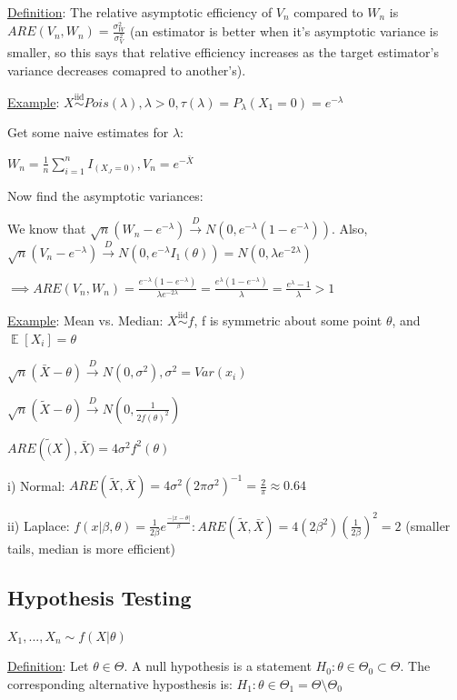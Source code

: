 \documentclass{article}
\DeclareMathOperator{\EX}{\mathbb{E}} %
\newcommand{\dto}{\overset{D}{\to}}
\let\Oldsum=\sum
\renewcommand{\sum}{\Oldsum\limits}
\newcommand{\iiddist}{\overset{\mathrm{iid}}{\sim}}
\begin{document}
\underline{Definition}: The relative asymptotic efficiency  of $V_n$ compared to $W_n$ is $ARE(V_n, W_n) = \frac{\sigma^2_W}{\sigma^2_V}$ (an estimator is better when it's asymptotic variance is smaller, so this says that relative efficiency increases as the target estimator's variance decreases comapred to another's).

\underline{Example}: $X \iiddist Pois(\lambda), \lambda > 0, \tau(\lambda) = P_{\lambda}(X_1 = 0) = e^{-\lambda}$

Get some naive estimates for $\lambda$:

$W_n = \frac{1}{n}\sum_{i=1}^n I_{(X_J = 0)}, V_n = e^{-\bar{X}}$

Now find the asymptotic variances:

We know that $\sqrt{n}(W_n - e^{-\lambda}) \dto N(0, e^{-\lambda}(1-e^{-\lambda}))$. Also, $\sqrt{n}(V_n - e^{-\lambda}) \dto N(0, e^{-\lambda}I_1(\theta)) = N(0, \lambda e^{-2\lambda})$

$\implies ARE(V_n, W_n) = \frac{e^{-\lambda}(1-e^{-\lambda})}{\lambda e^{-2\lambda}} = \frac{e^{\lambda}(1-e^{-\lambda})}{\lambda} = \frac{e^{\lambda} - 1}{\lambda} > 1$

\underline{Example}: Mean vs. Median: $X \iiddist f$, f is symmetric about some point $\theta$, and $\EX[X_i] = \theta$

$\sqrt{n}(\bar{X} - \theta) \dto N(0, \sigma^2), \sigma^2 = Var(x_i)$

$\sqrt{n}(\tilde{X} - \theta) \dto N(0, \frac{1}{2f(\theta)^2})$

$ARE(\tilde(X), \bar{X}) = 4\sigma^2f^2(\theta)$

i) Normal: $ARE(\tilde{X}, \bar{X}) = 4\sigma^2(2\pi \sigma^2)^{-1} = \frac{2}{\pi} \approx 0.64$

ii) Laplace: $f(x|\beta, \theta) = \frac{1}{2\beta}e^{\frac{-|x-\theta|}{\beta}}: ARE(\tilde{X}, \bar{X}) = 4(2\beta^2)(\frac{1}{2\beta})^2 = 2$ (smaller tails, median is more efficient)

\subsection{Hypothesis Testing}

$X_1, ..., X_n \sim f(X|\theta)$

\underline{Definition}: Let $\theta \in \Theta$. A null hypothesis is a statement $H_0: \theta \in \Theta_0 \subset \Theta$. The corresponding alternative hyposthesis is: $H_1: \theta \in \Theta_1 = \Theta \setminus \Theta_0$
\end{document}
